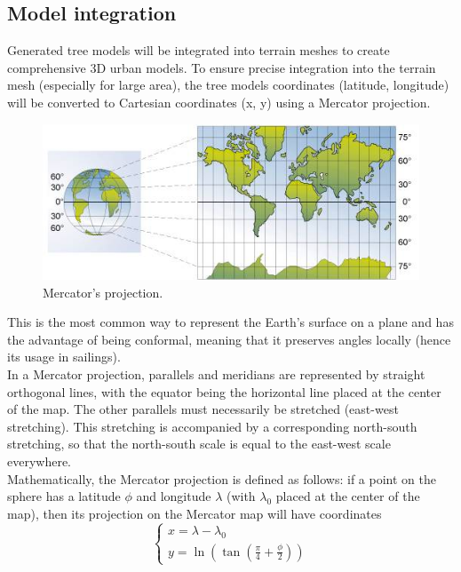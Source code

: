 \documentclass[12pt]{article}
\begin{document}
\subsection{Model integration}
Generated tree models will be integrated into terrain meshes to create comprehensive
3D urban models. To ensure precise integration into the terrain mesh (especially for large area), the tree models coordinates
(latitude, longitude) will be converted to Cartesian coordinates (x, y) using
a Mercator projection\cite{mercator-proj}.  \\
\begin{figure}[H]
    \centering
    \includegraphics[width=1\textwidth]{images/mercator.jpg}
    \caption{Mercator's projection.}
\end{figure}

This is the most common way to represent the Earth's surface on a plane and has 
the advantage of being conformal, meaning that it preserves angles locally (hence
 its usage in sailings). \\
 In a Mercator projection, parallels and meridians are represented by straight 
 orthogonal lines, with the equator being the horizontal line placed at the center
  of the map. The other parallels must necessarily be stretched (east-west 
  stretching). This stretching is accompanied by a corresponding north-south 
  stretching, so that the north-south scale is equal to the east-west scale 
  everywhere. \\
  Mathematically, the Mercator projection is defined as follows: if a point on 
  the sphere has a latitude $\phi$ and longitude $\lambda$ (with $\lambda_{0}$ 
  placed at the center of the map), then its projection on the Mercator map will 
  have coordinates 
  \begin{equation}
    \left\{
    \begin{array}{l}
        x =  \lambda - \lambda_{0} \\
        y =  \ln(\tan(\frac{\pi}{4} + \frac{\phi}{2}))
    \end{array}
    \right.
\end{equation}
\end{document}
